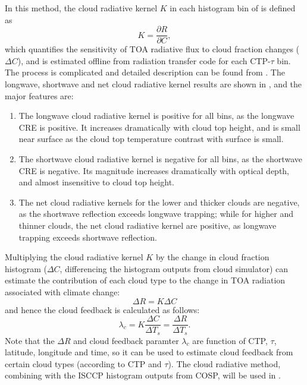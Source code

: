 In this method, the cloud radiative kernel $K$ in each histogram bin of  is defined as
\begin{equation}
    K = \frac{\partial R}{\partial C},
\end{equation}
which quantifies the sensitivity of TOA radiative flux to cloud fraction changes ($\Delta C$), and is estimated offline from radiation transfer code for each CTP-$\tau$ bin. The process is complicated and detailed description can be found from \cite{Zelinka2012computing1}. The longwave, shortwave and net cloud radiative kernel results are shown in , and the major features are:
\begin{enumerate}
    \item The longwave cloud radiative kernel is positive for all bins, as the longwave CRE is positive. It increases dramatically with cloud top height, and is small near surface as the cloud top temperature contrast with surface is small.
    \item The shortwave cloud radiative kernel is negative for all bins, as the shortwave CRE is negative. Its magnitude increases dramatically with optical depth, and almost insensitive to cloud top height.
    \item The net cloud radiative kernels for the lower and thicker clouds are negative, as the shortwave reflection exceeds longwave trapping; while for higher and thinner clouds, the net cloud radiative kernel are positive, as longwave trapping exceeds shortwave reflection.
\end{enumerate}
Multiplying the cloud radiative kernel $K$ by the change in cloud fraction histogram ($\Delta C$, differencing the histogram outputs from cloud simulator) can estimate the contribution of each cloud type to the change in TOA radiation associated with climate change:
\begin{equation}
    \Delta R = K \Delta C
\end{equation}
and hence the cloud feedback is calculated as follows:
\begin{equation}
    \lambda_c = K \frac{\Delta C}{\Delta T_s} = \frac{\Delta R}{\Delta {T}_s}.
\end{equation}
Note that the $\Delta R$ and cloud feedback paramter $\lambda_c$ are function of CTP, $\tau$, latitude, longitude and time, so it can be used to estimate cloud feedback from certain cloud types (according to CTP and $\tau$). The cloud radiative method, combining with the ISCCP histogram outputs from COSP, will be used in .

